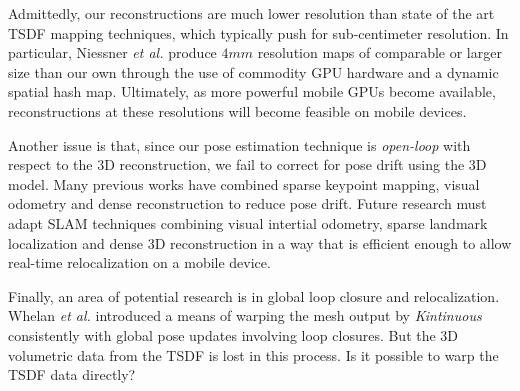 \documentclass[conference]{IEEEtran}
\newcommand{\etal}{\textit{et al.}}
\newif\iffinalcopy
\begin{document}
Admittedly, our reconstructions are much lower resolution than state of the art
TSDF mapping techniques, which typically push for sub-centimeter resolution. In
particular, Niessner \etal \cite{NiessnerHashing} produce $4mm$ resolution maps
of comparable or larger size than our own through the use of commodity GPU
hardware and a dynamic spatial hash map. Ultimately, as more powerful mobile
GPUs become available, reconstructions at these resolutions will become
feasible on mobile devices. 

Another issue is that, since our pose estimation technique is
\textit{open-loop} with respect to the 3D reconstruction, we fail to correct for
pose drift using the 3D model. Many previous works \cite{StuecklerSparseDense,
niessner2014combining} have combined sparse keypoint mapping, visual odometry
and dense reconstruction to reduce pose drift. Future research must adapt SLAM
techniques combining visual intertial odometry, sparse landmark localization
and dense 3D reconstruction in a way that is efficient enough to allow
real-time relocalization on a mobile device.

Finally, an area of potential research is in global loop closure and
relocalization. Whelan \etal\cite{WhelanLoopClose} introduced a means of warping
the mesh output by \textit{Kintinuous} consistently with global pose updates
 involving loop closures. But the 3D volumetric data from the TSDF is lost in
 this process. Is it possible to warp the TSDF data directly?


\iffinalcopy
	\section*{Acknowledgements}
	This work was done as part of Google's Advanced Technologies and Projects
	division (ATAP) for \emph{Project Tango}. Thanks to Johnny Lee, Joel Hesch, Esha
	Nerurkar, and Simon Lynen and other ATAP members for their close collaboration
	and support on this project. Thanks to Ryan Hickman for collecting outdoor data.
\fi



 
\end{document}
